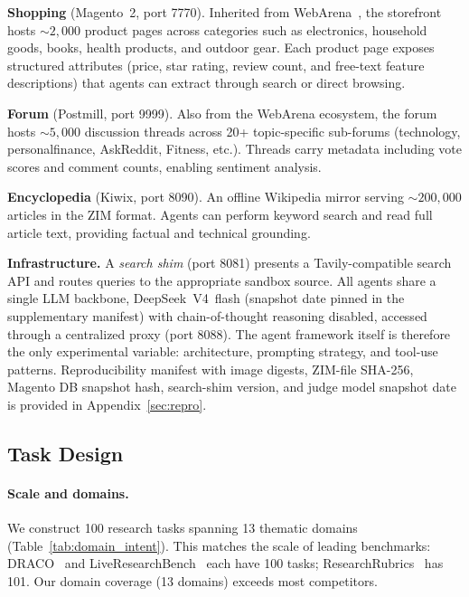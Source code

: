 \documentclass{article}
\begin{document}
\textbf{Shopping} (Magento~2, port 7770). Inherited from WebArena~\citep{webarena2024}, the storefront hosts ${\sim}2{,}000$ product pages across categories such as electronics, household goods, books, health products, and outdoor gear. Each product page exposes structured attributes (price, star rating, review count, and free-text feature descriptions) that agents can extract through search or direct browsing.

\textbf{Forum} (Postmill, port 9999). Also from the WebArena ecosystem, the forum hosts ${\sim}5{,}000$ discussion threads across 20+ topic-specific sub-forums (technology, personalfinance, AskReddit, Fitness, etc.). Threads carry metadata including vote scores and comment counts, enabling sentiment analysis.

\textbf{Encyclopedia} (Kiwix, port 8090). An offline Wikipedia mirror serving ${\sim}200{,}000$ articles in the ZIM format. Agents can perform keyword search and read full article text, providing factual and technical grounding.

\textbf{Infrastructure.} A \emph{search shim} (port 8081) presents a Tavily-compatible search API and routes queries to the appropriate sandbox source. All agents share a single LLM backbone, DeepSeek~V4~flash (snapshot date pinned in the supplementary manifest) with chain-of-thought reasoning disabled, accessed through a centralized proxy (port 8088). The agent framework itself is therefore the only experimental variable: architecture, prompting strategy, and tool-use patterns. Reproducibility manifest with image digests, ZIM-file SHA-256, Magento DB snapshot hash, search-shim version, and judge model snapshot date is provided in Appendix~\ref{sec:repro}.

\subsection{Task Design}
\label{sec:tasks}

\paragraph{Scale and domains.} We construct 100 research tasks spanning 13 thematic domains (Table~\ref{tab:domain_intent}). This matches the scale of leading benchmarks: DRACO~\citep{draco2026} and LiveResearchBench~\citep{liveresearchbench2026} each have 100 tasks; ResearchRubrics~\citep{researchrubrics2025} has 101. Our domain coverage (13 domains) exceeds most competitors.
\end{document}
